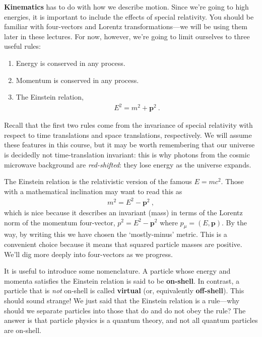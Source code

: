 \documentclass[12pt]{article}
\numberwithin{equation}{section}    %
\renewcommand{\vec}[1]{\mathbf{#1}} %
\theoremstyle{definition}
\begin{document}
\textbf{Kinematics} has to do with how we describe motion. Since we're going to high energies, it is important to include the effects of special relativity. You should be familiar with four-vectors and Lorentz transformations---we will be using them later in these lectures. For now, however, we're going to limit ourselves to three useful rules:
\begin{enumerate}
	\item Energy is conserved in any process.
	\item Momentum is conserved in any process.
	\item The Einstein relation,
\begin{align}
	E^2 = m^2 + \vec{p}^2 \ .
\end{align}
\end{enumerate}
%
Recall that the first two rules come from the invariance of special relativity with respect to time translations and space translations, respectively. We will assume these features in this course, but it may be worth remembering that our universe is decidedly not time-translation invariant: this is why photons from the cosmic microwave background are \emph{red-shifted}: they lose energy as the universe expands.

The Einstein relation is the relativistic version of the famous $E=mc^2$. Those with a mathematical inclination may want to read this as
\begin{align}
	m^2 = E^2 - \vec{p}^2 \ ,
	\label{eq:mass:shell}
\end{align}
which is nice because it describes an invariant (mass) in terms of the Lorentz norm of the momentum four-vector, $p^2 = E^2-\vec p^2$ where $p_\mu = (E, \vec p)$. By the way, by writing this we have chosen the `mostly-minus' metric. This is a convenient choice because it means that squared particle masses are positive. We'll dig more deeply into four-vectors as we progress. 

It is useful to introduce some nomenclature. A particle whose energy and momenta satisfies the Einstein relation is said to be \textbf{on-shell}. In contrast, a particle that is \emph{not} on-shell is called \textbf{virtual} (or, equivalently \textbf{off-shell}). This should sound strange! We just said that the Einstein relation is a rule---why should we separate particles into those that do and do not obey the rule? The answer is that particle physics is a quantum theory, and not all quantum particles are on-shell.
\end{document}

